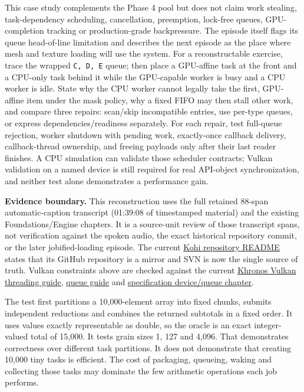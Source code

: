This case study complements the Phase 4 pool but does not claim work stealing, task-dependency scheduling, cancellation, preemption, lock-free queues, GPU-completion tracking or production-grade backpressure. The episode itself flags its queue head-of-line limitation and describes the next episode as the place where mesh and texture loading will use the system. For a reconstructable exercise, trace the wrapped \texttt{C,\ D,\ E} queue; then place a GPU-affine task at the front and a CPU-only task behind it while the GPU-capable worker is busy and a CPU worker is idle. State why the CPU worker cannot legally take the first, GPU-affine item under the mask policy, why a fixed FIFO may then stall other work, and compare three repairs: scan/skip incompatible entries, use per-type queues, or express dependencies/readiness separately. For each repair, test full-queue rejection, worker shutdown with pending work, exactly-once callback delivery, callback-thread ownership, and freeing payloads only after their last reader finishes. A CPU simulation can validate those scheduler contracts; Vulkan validation on a named device is still required for real API-object synchronization, and neither test alone demonstrates a performance gain.

\textbf{Evidence boundary.} This reconstruction uses the full retained 88-span automatic-caption transcript (01:39:08 of timestamped material) and the existing Foundations/Engine chapters. It is a source-unit review of those transcript spans, not verification against the spoken audio, the exact historical repository commit, or the later jobified-loading episode. The current \href{https://github.com/travisvroman/kohi}{Kohi repository README} states that its GitHub repository is a mirror and SVN is now the single source of truth. Vulkan constraints above are checked against the current \href{https://docs.vulkan.org/guide/latest/threading.html}{Khronos Vulkan threading guide}, \href{https://docs.vulkan.org/guide/latest/queues.html}{queue guide} and \href{https://docs.vulkan.org/spec/latest/chapters/devsandqueues.html}{specification device/queue chapter}.

The test first partitions a 10,000-element array into fixed chunks, submits independent reductions and combines the returned subtotals in a fixed order. It uses values exactly representable as double, so the oracle is an exact integer-valued total of 15,000. It tests grain sizes 1, 127 and 4,096. That demonstrates correctness over different task partitions. It does not demonstrate that creating 10,000 tiny tasks is efficient. The cost of packaging, queueing, waking and collecting those tasks may dominate the few arithmetic operations each job performs.

